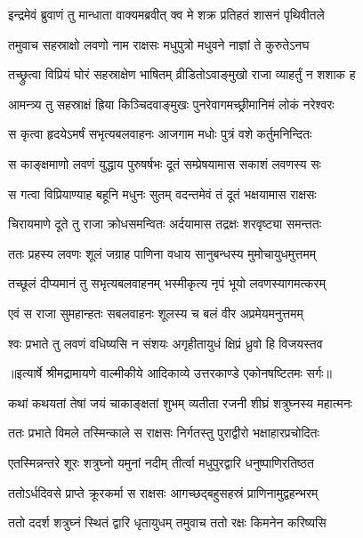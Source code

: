 \twolineshloka
{इन्द्रमेवं ब्रुवाणं तु मान्धाता वाक्यमब्रवीत्}
{क्व मे शक्र प्रतिहतं शासनं पृथिवीतले} %

\twolineshloka
{तमुवाच सहस्राक्षो लवणो नाम राक्षसः}
{मधुपुत्रो मधुवने नाज्ञां ते कुरुतेऽनघ} %

\twolineshloka
{तच्छ्रुत्वा विप्रियं घोरं सहस्राक्षेण भाषितम्}
{व्रीडितोऽवाङ्मुखो राजा व्याहर्तुं न शशाक ह} %

\twolineshloka
{आमन्त्र्य तु सहस्राक्षं ह्रिया किञ्चिदवाङ्मुखः}
{पुनरेवागमच्छ्रीमानिमं लोकं नरेश्वरः} %

\twolineshloka
{स कृत्वा हृदयेऽमर्षं सभृत्यबलवाहनः}
{आजगाम मधोः पुत्रं वशे कर्तुमनिन्दितः} %

\twolineshloka
{स काङ्क्षमाणो लवणं युद्धाय पुरुषर्षभः}
{दूतं सम्प्रेषयामास सकाशं लवणस्य सः} %

\twolineshloka
{स गत्वा विप्रियाण्याह बहूनि मधुनः सुतम्}
{वदन्तमेवं तं दूतं भक्षयामास राक्षसः} %

\twolineshloka
{चिरायमाणे दूते तु राजा क्रोधसमन्वितः}
{अर्दयामास तद्रक्षः शरवृष्ट्या समन्ततः} %

\twolineshloka
{ततः प्रहस्य लवणः शूलं जग्राह पाणिना}
{वधाय सानुबन्धस्य मुमोचायुधमुत्तमम्} %

\twolineshloka
{तच्छूलं दीप्यमानं तु सभृत्यबलवाहनम्}
{भस्मीकृत्य नृपं भूयो लवणस्यागमत्करम्} %

\twolineshloka
{एवं स राजा सुमहान्हतः सबलवाहनः}
{शूलस्य च बलं वीर अप्रमेयमनुत्तमम्} %

\twolineshloka
{श्वः प्रभाते तु लवणं वधिष्यसि न संशयः}
{अगृहीतायुधं क्षिप्रं ध्रुवो हि विजयस्तव} %


{॥इत्यार्षे श्रीमद्रामायणे वाल्मीकीये आदिकाव्ये उत्तरकाण्डे एकोनषष्टितमः सर्गः॥}


\twolineshloka
{कथां कथयतां तेषां जयं चाकाङ्क्षतां शुभम्}
{व्यतीता रजनी शीघ्रं शत्रुघ्नस्य महात्मनः} %

\twolineshloka
{ततः प्रभाते विमले तस्मिन्काले स राक्षसः}
{निर्गतस्तु पुराद्वीरो भक्षाहारप्रचोदितः} %

\twolineshloka
{एतस्मिन्नन्तरे शूरः शत्रुघ्नो यमुनां नदीम्}
{तीर्त्वा मधुपुरद्वारि धनुष्पाणिरतिष्ठत} %

\twolineshloka
{ततोऽर्धदिवसे प्राप्ते क्रूरकर्मा स राक्षसः}
{आगच्छद्बहुसहस्रं प्राणिनामुद्वहन्भरम्} %

\twolineshloka
{ततो ददर्श शत्रुघ्नं स्थितं द्वारि धृतायुधम्}
{तमुवाच ततो रक्षः किमनेन करिष्यसि} %

